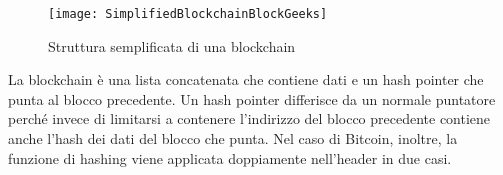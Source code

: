 \begin{figure}[h!]
\centering
\texttt{[image: SimplifiedBlockchainBlockGeeks]}
\caption{Struttura semplificata di una blockchain\protect\footnotemark}
\label{fig:simplifiedblockchainblockgeeks}
\end{figure}



La blockchain è una lista concatenata che contiene dati e un hash pointer che punta al blocco precedente. Un hash pointer differisce da un normale puntatore perché invece di limitarsi a contenere l’indirizzo del blocco precedente contiene anche l’hash dei dati del blocco che punta. Nel caso di Bitcoin, inoltre, la funzione di hashing viene applicata doppiamente nell’header in due casi.\\

\begin{table}[ht]
	\centering
\caption{Struttura dell'header di un blocco Bitcoin (documentazione ufficiale bitcoin.org)}
\end{table}


